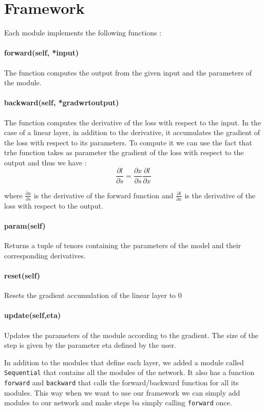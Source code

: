 \documentclass{article}
\begin{document}
\thispagestyle{fancy}

\section{Framework}

Each module implements the following functions : 

\paragraph{forward(self, *input)}
The function computes the output from the given input and the parameters of the module.
    
\paragraph{backward(self, *gradwrtoutput)}
The function computes the derivative of the loss with respect to the input. In the case of a linear layer, in addition to the derivative, it accumulates the gradient of the loss with respect to its parameters. To compute it we can use the fact that trhe function takes as parameter the gradient of the loss with respect to the output and thus we have : 
\[\frac{\partial l}{\partial s} = \frac{\partial x}{\partial s} \frac{\partial l}{\partial x}\] 

where $\frac{\partial x}{\partial s}$ is the derivative of the forward function and $\frac{\partial l}{\partial x}$ is the derivative of the loss with respect to the output.

\paragraph{param(self)}
Returns a tuple of tenors containing the parameters of the model and their corresponding derivatives. 
    
\paragraph{reset(self)}
Resets the gradient accumulation of the linear layer to 0
    
\paragraph{update(self,eta)}
Updates the parameters of the module according to the gradient. The size of the step is given by the parameter eta defined by the user. 


In addition to the modules that define each layer, we added a module called \verb|Sequential| that contains all the modules of the network. It also has a function \verb|forward| and \verb|backward| that calls the forward/backward function for all its modules. This way when we want to use our framework we can simply add modules to our network and make steps ba simply calling \verb|forward| once. 
\\
\end{document}
